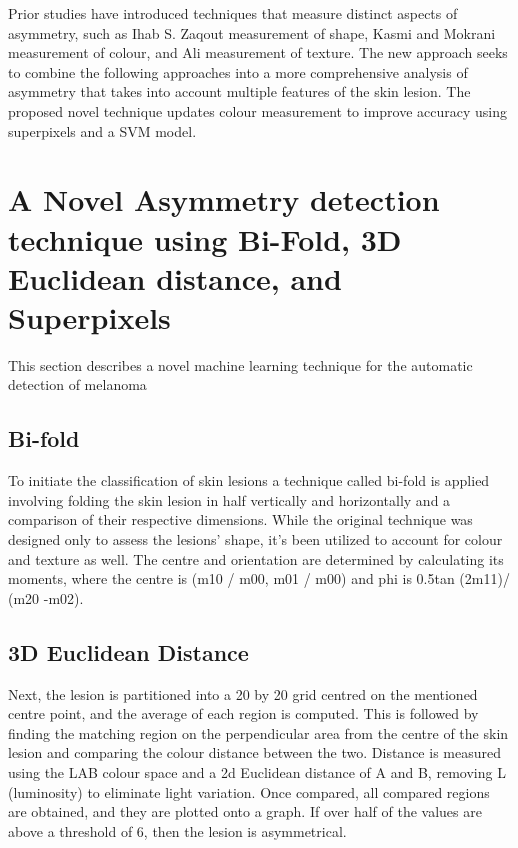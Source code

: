 Prior studies have introduced techniques that measure distinct aspects of asymmetry, such as Ihab S. Zaqout\cite{Zaqout2016} measurement of shape, Kasmi and Mokrani\cite{Kasmi2016} measurement of colour, and  Ali\cite{Ali2020a} measurement of texture. The new approach seeks to combine the following approaches into a more comprehensive analysis of asymmetry that takes into account multiple features of the skin lesion. The proposed novel technique updates colour measurement to improve accuracy using superpixels and a SVM model.

\section{A Novel Asymmetry detection technique using Bi-Fold, 3D Euclidean distance, and Superpixels}
This section describes a novel machine learning technique for the automatic detection of melanoma

\subsection{Bi-fold}
To initiate the classification of skin lesions a technique called bi-fold is applied involving folding the skin lesion in half vertically and horizontally and a comparison of their respective dimensions. While the original technique was designed only to assess the lesions' shape, it's been utilized to account for colour and texture as well. The centre and orientation are determined by calculating its moments, where the centre is (m10 / m00, m01 / m00) and phi is 0.5tan (2m11)/ (m20 -m02).


\subsection{3D Euclidean Distance}
Next, the lesion is partitioned into a 20 by 20 grid centred on the mentioned centre point, and the average of each region is computed. This is followed by finding the matching region on the perpendicular area from the centre of the skin lesion and comparing the colour distance between the two. Distance is measured using the LAB colour space and a 2d Euclidean distance of A and B, removing L (luminosity) to eliminate light variation. Once compared, all compared regions are obtained, and they are plotted onto a graph. If over half of the values are above a threshold of 6, then the lesion is asymmetrical.


